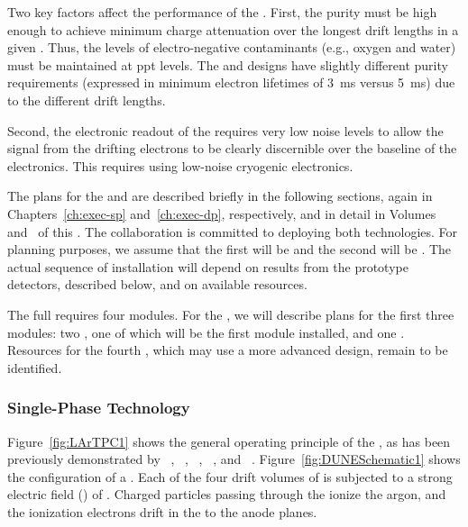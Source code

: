 Two key factors affect the performance of the  .  First, the  purity must be high enough to achieve minimum charge attenuation over the longest drift lengths in a given .  Thus, the levels of electro-negative contaminants (e.g., oxygen and water) must be maintained at ppt levels.  The  and  designs have slightly different purity requirements (expressed in minimum electron lifetimes of \SI{3}{ms} versus \SI{5}{ms}) due to the different drift lengths.

Second, the electronic readout of the  requires very low noise levels to allow the signal from the drifting electrons to be clearly discernible over the baseline of the electronics.  This requires using low-noise cryogenic electronics. 

The plans for the  and   are described briefly in the following sections, again in Chapters~\ref{ch:exec-sp} and~\ref{ch:exec-dp}, respectively, and in detail in Volumes~\volnumbersp{} and~\volnumberdp{} of this . 
The  collaboration is committed to deploying both technologies. 
For planning purposes, we assume that the first  will be
 and the second will be .
The actual sequence of  installation will depend on results from the prototype detectors, described below, and on available resources.

The full   requires four modules. For the , we will describe plans for the first three modules: two , one of which will be the first module installed, and one . Resources for the fourth , which may use a more advanced design, remain to be identified. 

\subsubsection{Single-Phase Technology}
\label{sec:fdsp-exec-splar}

Figure~\ref{fig:LArTPC1} shows the general operating principle of the  , as has been previously demonstrated by  ~\cite{Icarus-T600}, ~\cite{microboone}, ~\cite{Anderson:2012vc}, ~\cite{Cavanna:2014iqa}, and ~\cite{Abi:2017aow}. Figure~\ref{fig:DUNESchematic1} shows the configuration of a  . Each of the four drift volumes of  is subjected to a strong electric field (\efield{}) of \spmaxfield. Charged particles passing through the  ionize the argon, and the ionization electrons drift in the \efield to the anode planes. 

